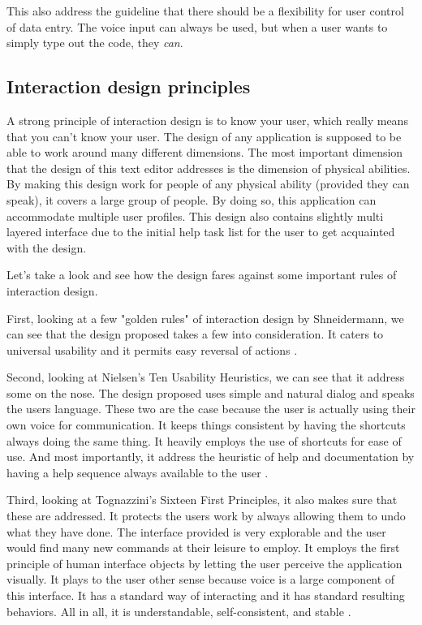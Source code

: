 \documentclass[11pt, oneside]{article}
\begin{document}
	This also address the guideline that there should be a flexibility for user control of data entry. The voice input can always be used, but when a user wants to simply type out the code, they \textit{can}.

	\subsection{Interaction design principles}
	A strong principle of interaction design is to know your user, which really means that you can't know your user. The design of any application is supposed to be able to work around many different dimensions. The most important dimension that the design of this text editor addresses is the dimension of physical abilities. By making this design work for people of any physical ability (provided they can speak), it covers a large group of people. By doing so, this application can accommodate multiple user profiles. This design also contains slightly multi layered interface due to the initial help task list for the user to get acquainted with the design.

	Let's take a look and see how the design fares against some important rules of interaction design.

	First, looking at a few "golden rules" of interaction design by Shneidermann, we can see that the design proposed takes a few into consideration. It caters to universal usability and it permits easy reversal of actions \cite{shniederman-golden-rules}.

	Second, looking at Nielsen's Ten Usability Heuristics, we can see that it address some on the nose. The design proposed uses simple and natural dialog and speaks the users language. These two are the case because the user is actually using their own voice for communication. It keeps things consistent by having the shortcuts always doing the same thing. It heavily employs the use of shortcuts for ease of use. And most importantly, it address the heuristic of help and documentation by having a help sequence always available to the user \cite{nielsen-usability-heuristics}.

	Third, looking at Tognazzini's Sixteen First Principles, it also makes sure that these are addressed. It protects the users work by always allowing them to undo what they have done. The interface provided is very explorable and the user would find many new commands at their leisure to employ. It employs the first principle of human interface objects by letting the user perceive the application visually. It plays to the user other sense because voice is a large component of this interface. It has a standard way of interacting and it has standard resulting behaviors. All in all, it is understandable, self-consistent, and stable \cite{tognazzini-first-principles}.
\end{document}
